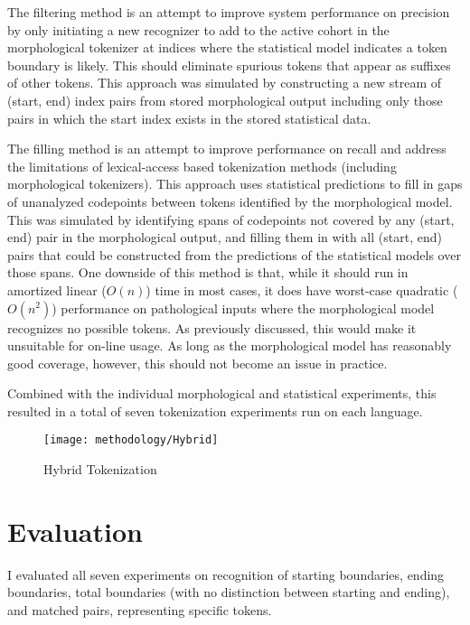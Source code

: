 The filtering method is an attempt to improve system performance on precision by only initiating a new recognizer to add to the active cohort in the morphological tokenizer at indices where the statistical model indicates a token boundary is likely. This should eliminate spurious tokens that appear as suffixes of other tokens. This approach was simulated by constructing a new stream of (start, end) index pairs from stored morphological output including only those pairs in which the start index exists in the stored statistical data.

The filling method is an attempt to improve performance on recall and address the limitations of lexical-access based tokenization methods (including morphological tokenizers). This approach uses statistical predictions to fill in gaps of unanalyzed codepoints between tokens identified by the morphological model. This was simulated by identifying spans of codepoints not covered by any (start, end) pair in the morphological output, and filling them in with all (start, end) pairs that could be constructed from the predictions of the statistical models over those spans. One downside of this method is that, while it should run in amortized linear ($O(n)$) time in most cases, it does have worst-case quadratic ($O(n^2)$) performance on pathological inputs where the morphological model recognizes no possible tokens. As previously discussed, this would make it unsuitable for on-line usage. As long as the morphological model has reasonably good coverage, however, this should not become an issue in practice.

Combined with the individual morphological and statistical experiments, this resulted in a total of seven tokenization experiments run on each language.

\begin{figure}
	\texttt{[image: methodology/Hybrid]}
	\caption{Hybrid Tokenization}
	\label{hybriddiagram}
\end{figure}

\section{Evaluation}
I evaluated all seven experiments on recognition of starting boundaries, ending boundaries, total boundaries (with no distinction between starting and ending), and matched pairs, representing specific tokens.

